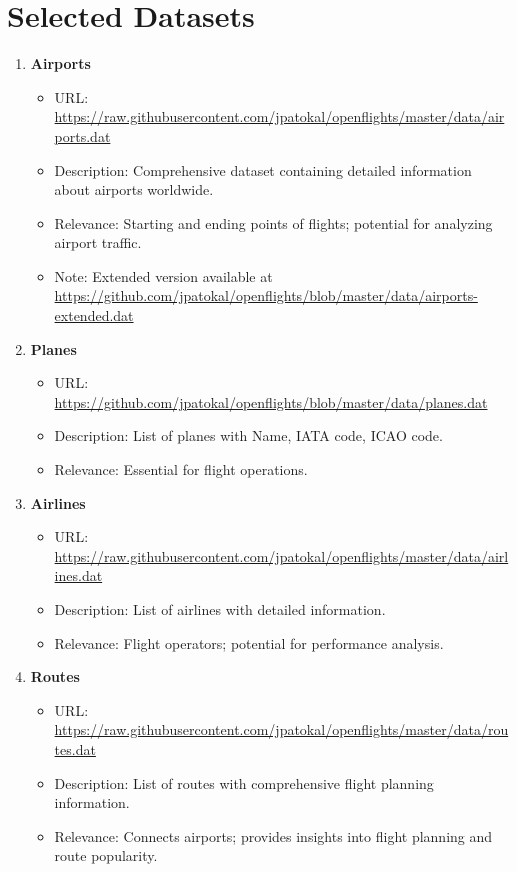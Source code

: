 \documentclass{article}
\begin{document}
\section{Selected Datasets}
\begin{enumerate}
    \item \textbf{Airports}
    \begin{itemize}
        \item URL: \href{https://raw.githubusercontent.com/jpatokal/openflights/master/data/airports.dat}{https://raw.githubusercontent.com/jpatokal/openflights/master/data/airports.dat}
        \item Description: Comprehensive dataset containing detailed information about airports worldwide.
        \item Relevance: Starting and ending points of flights; potential for analyzing airport traffic.
        \item Note: Extended version available at \href{https://github.com/jpatokal/openflights/blob/master/data/airports-extended.dat}{https://github.com/jpatokal/openflights/blob/master/data/airports-extended.dat}
    \end{itemize}
    
    \item \textbf{Planes}
    \begin{itemize}
        \item URL: \href{https://github.com/jpatokal/openflights/blob/master/data/planes.dat}{https://github.com/jpatokal/openflights/blob/master/data/planes.dat}
        \item Description: List of planes with Name, IATA code, ICAO code.
        \item Relevance: Essential for flight operations.
    \end{itemize}
    
    \item \textbf{Airlines}
    \begin{itemize}
        \item URL: \href{https://raw.githubusercontent.com/jpatokal/openflights/master/data/airlines.dat}{https://raw.githubusercontent.com/jpatokal/openflights/master/data/airlines.dat}
        \item Description: List of airlines with detailed information.
        \item Relevance: Flight operators; potential for performance analysis.
    \end{itemize}
    
    \item \textbf{Routes}
    \begin{itemize}
        \item URL: \href{https://raw.githubusercontent.com/jpatokal/openflights/master/data/routes.dat}{https://raw.githubusercontent.com/jpatokal/openflights/master/data/routes.dat}
        \item Description: List of routes with comprehensive flight planning information.
        \item Relevance: Connects airports; provides insights into flight planning and route popularity.
    \end{itemize}
    

\end{enumerate}
\end{document}
